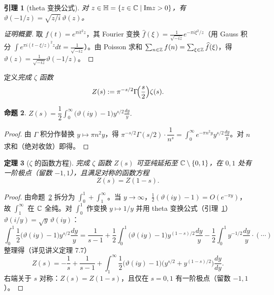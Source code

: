 \documentclass{article}
\theoremstyle{plain}
\newtheorem{thm}{定理}[section]
\newtheorem{lem}[thm]{引理}
\newtheorem{prop}[thm]{命题}
\theoremstyle{definition}
\theoremstyle{remark}
\begin{document}
\begin{lem}[theta 变换公式]\label{lem:theta-trans}
  对 $z\in\mathbb{H}=\{z\in\mathbb{C}\mid\mathrm{Im} z>0\}$，有 $\vartheta(-1/z)=\sqrt{z/i}\,\vartheta(z)$。
\end{lem}

\begin{proof}[证明概要]
  取 $f(t)=e^{\pi i t^2z}$，其 Fourier 变换 $\widehat f(\xi)=\frac1{\sqrt{-iz}}e^{-\pi i\xi^2/z}$（用 Gauss 积分 $\int e^{\pi i(t-\xi/z)^2z}dt=\frac1{\sqrt{-iz}}$）。由 Poisson 求和 $\sum_{n\in\mathbb{Z}}f(n)=\sum_{\xi\in\mathbb{Z}}\widehat f(\xi)$，得 $\vartheta(z)=\frac1{\sqrt{-iz}}\vartheta(-1/z)$。
\end{proof}

定义\emph{完成 $\zeta$ 函数}
\[
  Z(s):=\pi^{-s/2}\Gamma\!\Bigl(\frac{s}{2}\Bigr)\zeta(s).
\]

\begin{prop}\label{prop:zeta-integral}
  $Z(s)=\dfrac12\displaystyle\int_0^\infty\bigl(\vartheta(iy)-1\bigr)y^{s/2}\frac{dy}{y}.$
\end{prop}

\begin{proof}
  由 $\Gamma$ 积分作替换 $y\mapsto\pi n^2 y$，得 $\pi^{-s/2}\Gamma(s/2)\cdot\dfrac1{n^s}=\int_0^\infty e^{-\pi n^2y}y^{s/2}\frac{dy}{y}$。对 $n$ 求和（绝对收敛）即得。
\end{proof}

\begin{thm}[$\zeta$ 的函数方程]\label{thm:zeta-func-eq}
  完成 $\zeta$ 函数 $Z(s)$ 可亚纯延拓至 $\mathbb{C}\setminus\{0,1\}$，在 $0,1$ 处有一阶极点（留数 $-1,1$），且满足对称的函数方程
  \[
    Z(s)=Z(1-s).
  \]
\end{thm}

\begin{proof}
  由命题~\ref{prop:zeta-integral} 拆分为 $\int_0^1+\int_1^\infty$。当 $y\to\infty$，$\frac12(\vartheta(iy)-1)=O(e^{-\pi y})$，故 $\int_1^\infty$ 在 $\mathbb{C}$ 全纯。对 $\int_0^1$ 作变换 $y\mapsto1/y$ 并用 theta 变换公式（引理~\ref{lem:theta-trans}）$\vartheta(i/y)=\sqrt y\,\vartheta(iy)$：
  \[
    \int_0^1\frac12\bigl(\vartheta(iy)-1\bigr)y^{s/2}\frac{dy}{y}
    =\frac1{s-1}+\frac1{2}\int_0^1\bigl(\vartheta(iy)-1\bigr)y^{(1-s)/2}\frac{dy}{y}-\frac12\int_0^1y^{-1/2}\frac{dy}{y}\cdot(\cdots)
  \]
  整理得（详见讲义定理 7.7）
  \[
    Z(s)=-\frac1{s}+\frac1{s-1}+\int_1^\infty\frac12\bigl(\vartheta(iy)-1\bigr)\bigl(y^{s/2}+y^{(1-s)/2}\bigr)\frac{dy}{dy}.
  \]
  右端关于 $s$ 对称：$Z(s)=Z(1-s)$，且仅在 $s=0,1$ 有一阶极点（留数 $-1,1$）。
\end{proof}
\end{document}
